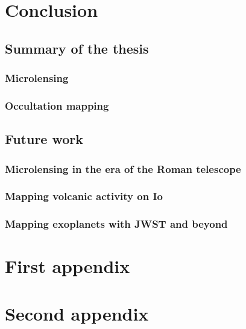 \documentclass[11pt]{report}
\begin{document}
\chapter{Conclusion}
\section{Summary of the thesis}
\subsection{Microlensing}
\subsection{Occultation mapping}
\section{Future work}
\subsection{Microlensing in the era of the Roman telescope}
\subsection{Mapping volcanic activity on Io}
\subsection{Mapping exoplanets with JWST and beyond}

\appendix

\chapter{First appendix}
\chapter{Second appendix}


\end{document}
